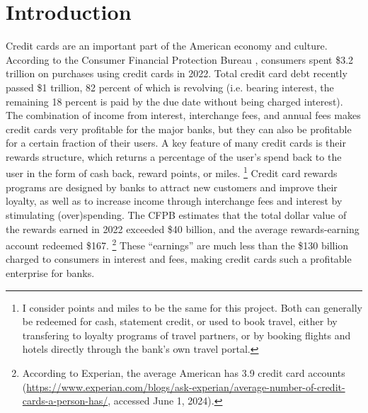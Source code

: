 \section{Introduction} \label{sec:Introduction}


Credit cards are an important part of the American economy and culture.
According to the Consumer Financial Protection Bureau \citep{cfpb:2023}, consumers spent \$3.2 trillion on purchases using credit cards in 2022. 
Total credit card debt recently passed \$1 trillion, 82 percent of which is revolving (i.e. bearing interest, the remaining 18 percent is paid by the due date without being charged interest). 
The combination of income from interest, interchange fees, and annual fees makes credit cards very profitable for the major banks, but they can also be profitable for a certain fraction of their users.
A key feature of many credit cards is their rewards structure, which returns a percentage of the user's spend back to the user in the form of cash back, reward points, or miles.%
\footnote{I consider points and miles to be the same for this project. Both can generally be redeemed for cash, statement credit, or used to book travel, either by transfering to loyalty programs of travel partners, or by booking flights and hotels directly through the bank's own travel portal.}
Credit card rewards programs are designed by banks to attract new customers and improve their loyalty, as well as to increase income through interchange fees and interest by stimulating (over)spending.
The CFPB estimates that the total dollar value of the rewards earned in 2022 exceeded \$40 billion, and the average rewards-earning account redeemed \$167.%
\footnote{According to Experian, the average American has 3.9 credit card accounts (\url{https://www.experian.com/blogs/ask-experian/average-number-of-credit-cards-a-person-has/}, accessed June 1, 2024).} 
These ``earnings'' are much less than the \$130 billion charged to consumers in interest and fees, making credit cards such a profitable enterprise for banks. 

